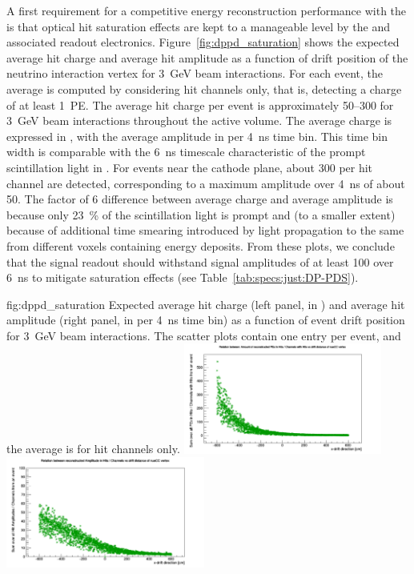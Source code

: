 A first requirement for a competitive energy reconstruction performance with the  is that optical hit saturation effects are kept to a manageable level by the  and associated readout electronics. Figure~\ref{fig:dppd_saturation} shows the expected average hit charge and average hit amplitude as a function of drift position of the neutrino interaction vertex for \SI{3}{\GeV} beam \nue {} interactions. For each event, the average is computed by considering hit  channels only, that is,  detecting a charge of at least \SI{1}{PE}. The average hit charge per event is approximately \SIrange{50}{300}{} for \SI{3}{\GeV} beam \nue {} interactions throughout the  active volume. The average charge is expressed in , with the average amplitude in  per \SI{4}{\nano\s} time bin. This time bin width is comparable with the \SI{6}{\nano\s} timescale characteristic of the prompt scintillation light in . For events near the cathode plane, about \SI{300}{} per hit channel are detected, corresponding to a maximum amplitude over \SI{4}{\nano\s} of about \SI{50}{}. The factor of 6 difference between average charge and average amplitude is because only \SI{23}{\%} of the scintillation light is prompt and (to a smaller extent) because of additional time smearing introduced by light propagation to the same  from different  voxels containing energy deposits. From these plots, we conclude that the  signal readout should withstand signal amplitudes of at least \SI{100}{} over \SI{6}{\nano\s} to mitigate saturation effects (see Table~\ref{tab:specs:just:DP-PDS}).

\begin{dunefigure}{fig:dppd_saturation}
{Expected average hit charge (left panel, in ) and average hit amplitude (right panel, in  per \SI{4}{\nano\s} time bin) as a function of event drift position for \SI{3}{\GeV} beam \nue {} interactions. The scatter plots  contain one entry per event, and the average is for hit  channels only.}
\includegraphics[trim={0cm 0cm 0cm 1.cm}, clip, width=0.49\textwidth]{graphics/dppd_avg_charge_per_channel.pdf} \hfill
\includegraphics[trim={0cm 0cm 0cm 1.cm}, clip, width=0.49\textwidth]{graphics/dppd_avg_amplitude_per_channel.pdf}
\end{dunefigure}

